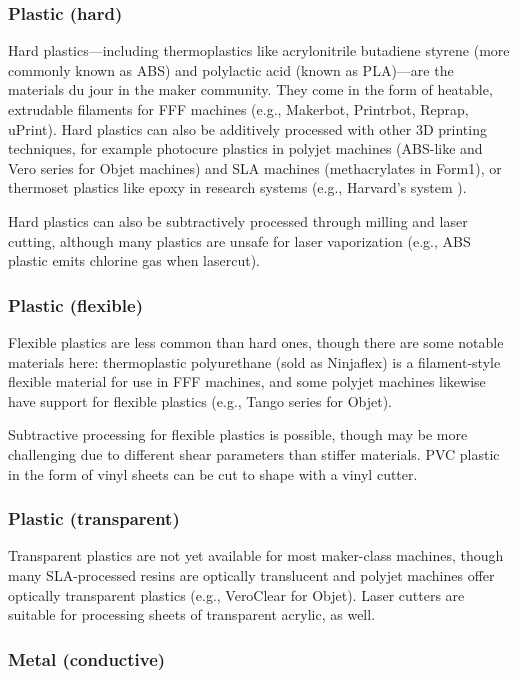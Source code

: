 \subsubsection{Plastic (hard)}

Hard plastics---including thermoplastics like acrylonitrile butadiene styrene (more commonly known as ABS) and polylactic acid (known as PLA)---are the materials du jour in the maker community. They come in the form of heatable, extrudable filaments for FFF machines (e.g., Makerbot, Printrbot, Reprap, uPrint). Hard plastics can also be additively processed with other 3D printing techniques, for example photocure plastics in polyjet machines (ABS-like and Vero series for Objet machines) and SLA machines (methacrylates in Form1), or thermoset plastics like epoxy in research systems (e.g., Harvard's system \cite{compton-epoxy}).

Hard plastics can also be subtractively processed through milling and laser cutting, although many plastics are unsafe for laser vaporization (e.g., ABS plastic emits chlorine gas when lasercut).

\subsubsection{Plastic (flexible)}

Flexible plastics are less common than hard ones, though there are some notable materials here: thermoplastic polyurethane (sold as Ninjaflex) is a filament-style flexible material for use in FFF machines, and some polyjet machines likewise have support for flexible plastics (e.g., Tango series for Objet).

Subtractive processing for flexible plastics is possible, though may be more challenging due to different shear parameters than stiffer materials. PVC plastic in the form of vinyl sheets can be cut to shape with a vinyl cutter.

\subsubsection{Plastic (transparent)}

Transparent plastics are not yet available for most maker-class machines, though many SLA-processed resins are optically translucent and polyjet machines offer optically transparent plastics (e.g., VeroClear for Objet). Laser cutters are suitable for processing sheets of transparent acrylic, as well.

\subsubsection{Metal (conductive)}

